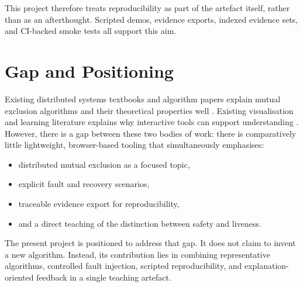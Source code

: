This project therefore treats reproducibility as part of the artefact itself, rather than as an afterthought. Scripted demos, evidence exports, indexed evidence sets, and CI-backed smoke tests all support this aim.

\section{Gap and Positioning}
Existing distributed systems textbooks and algorithm papers explain mutual exclusion algorithms and their theoretical properties well \cite{tanenbaum2017distributed,coulouris2011distributed,lynch1996distributed,ricart1981optimal,suzuki1985distributed}. Existing visualisation and learning literature explains why interactive tools can support understanding \cite{naps2002engagement,hundhausen2002meta,sorva2013visual}. However, there is a gap between these two bodies of work: there is comparatively little lightweight, browser-based tooling that simultaneously emphasises:
\begin{itemize}
  \item distributed mutual exclusion as a focused topic,
  \item explicit fault and recovery scenarios,
  \item traceable evidence export for reproducibility,
  \item and a direct teaching of the distinction between safety and liveness.
\end{itemize}

The present project is positioned to address that gap. It does not claim to invent a new algorithm. Instead, its contribution lies in combining representative algorithms, controlled fault injection, scripted reproducibility, and explanation-oriented feedback in a single teaching artefact.